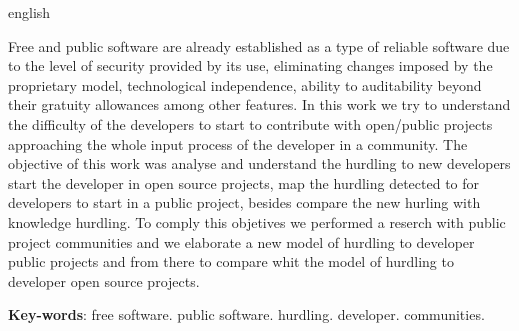 \begin{resumo}[Abstract]
 \begin{otherlanguage*}{english}
   
Free and public software are already established as a type of reliable software
due to the level of security provided by its use, eliminating changes
imposed by the proprietary model, technological independence, ability to
auditability beyond their gratuity allowances among other features.
%
In this work we try to understand the difficulty of the developers to start
to contribute with open/public projects approaching the whole input process of
the developer in a community.
%
The objective of this work was analyse and understand the hurdling to new developers
start the developer in open source projects, map the hurdling detected to for
developers to start in a public project, besides compare the new hurling with
knowledge hurdling.
%
To comply this objetives we performed a reserch with public project communities
and we elaborate a new model of hurdling to developer public projects and
from there to compare whit the model of hurdling to developer open source projects.

   \vspace{\onelineskip}
 
   \noindent 
   \textbf{Key-words}: free software. public software. hurdling. developer. communities.
 \end{otherlanguage*}
\end{resumo}
